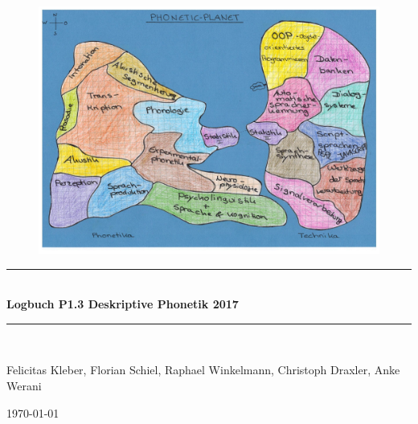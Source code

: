 \documentclass[11pt]{book}
\begin{document}
\begin{titlepage}
\begin{center}
\begin {figure}[t]
\includegraphics[width=1.0\textwidth] {grafiken/titel/landkarte.jpg} \\
\end{figure} 

\newcommand{\HRule}{\rule{\linewidth}{0.5mm}}
\HRule \\[0.4cm]
{ \huge \bfseries Logbuch P1.3 Deskriptive Phonetik 2017}\\[0.4cm]
\HRule \\[0.5cm]

\begin{minipage}{0.4\textwidth}
\large
Felicitas Kleber, Florian Schiel, Raphael Winkelmann, Christoph Draxler, Anke Werani 

\end{minipage}

{\large \today}\vspace {1cm}


\end{center}
\end{titlepage}
\end{document}
